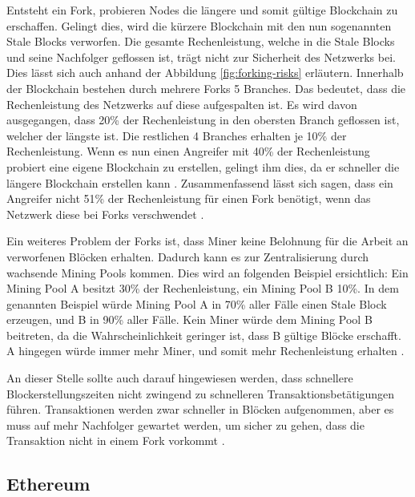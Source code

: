 Entsteht ein Fork, probieren Nodes die längere und somit gültige Blockchain zu erschaffen. Gelingt dies, wird die kürzere Blockchain mit den nun sogenannten Stale Blocks verworfen. Die gesamte Rechenleistung, welche in die Stale Blocks und seine Nachfolger geflossen ist, trägt nicht zur Sicherheit des Netzwerks bei. Dies lässt sich auch anhand der Abbildung \ref{fig:forking-risks} erläutern. Innerhalb der Blockchain bestehen durch mehrere Forks 5 Branches. Das bedeutet, dass die Rechenleistung des Netzwerks auf diese aufgespalten ist. Es wird davon ausgegangen, dass 20\% der Rechenleistung in den obersten Branch geflossen ist, welcher der längste ist. Die restlichen 4 Branches erhalten je 10\% der Rechenleistung. Wenn es nun einen Angreifer mit 40\% der Rechenleistung probiert eine eigene Blockchain zu erstellen, gelingt ihm dies, da er schneller die längere Blockchain erstellen kann \cite{SompolinskyAcceleratingBitcoinTransaction2013}. Zusammenfassend lässt sich sagen, dass ein Angreifer nicht 51\% der Rechenleistung für einen Fork benötigt, wenn das Netzwerk diese bei Forks verschwendet \cite{Buterin12secondBlockTime2014}. 

Ein weiteres Problem der Forks ist, dass Miner keine Belohnung für die Arbeit an verworfenen Blöcken erhalten. Dadurch kann es zur Zentralisierung durch wachsende Mining Pools kommen. Dies wird an folgenden Beispiel ersichtlich: Ein Mining Pool A besitzt 30\% der Rechenleistung, ein Mining Pool B 10\%. In dem genannten Beispiel würde Mining Pool A in 70\% aller Fälle einen Stale Block erzeugen, und B in 90\% aller Fälle. Kein Miner würde dem Mining Pool B beitreten, da die Wahrscheinlichkeit geringer ist, dass B gültige Blöcke erschafft. A hingegen würde immer mehr Miner, und somit mehr Rechenleistung erhalten \cite{EthereumTeamEthereumWhitePaper2017}.

An dieser Stelle sollte auch darauf hingewiesen werden, dass schnellere Blockerstellungszeiten nicht zwingend zu schnelleren Transaktionsbetätigungen führen. Transaktionen werden zwar schneller in Blöcken aufgenommen, aber es muss auf mehr Nachfolger gewartet werden, um sicher zu gehen, dass die Transaktion nicht in einem Fork vorkommt \cite{SchererPerformanceScalabilityBlockchain2017}.

\subsection{Ethereum}

